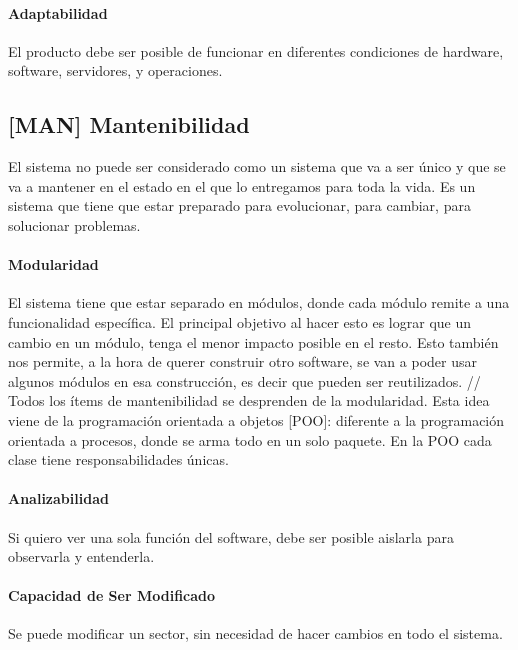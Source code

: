 \hypertarget{adaptabilidad}{%
\paragraph{Adaptabilidad}\label{adaptabilidad}}
El producto debe ser posible de funcionar en
diferentes condiciones de hardware, software, servidores, y operaciones.

\hypertarget{mantenibilidad-man}{%
\subsection{%
{[}MAN{]}
Mantenibilidad
}\label{mantenibilidad-man}}

El sistema no puede ser considerado como un sistema que va a ser único y
que se va a mantener en el estado en el que lo entregamos para toda la
vida. Es un sistema que tiene que estar preparado para evolucionar, para
cambiar, para solucionar problemas.

\hypertarget{modularidad}{%
\paragraph{Modularidad}\label{modularidad}}
El sistema tiene que estar separado en módulos,
  donde cada módulo remite a una funcionalidad específica. El principal
  objetivo al hacer esto es lograr que un cambio en un módulo, tenga el
  menor impacto posible en el resto. Esto también nos permite, a la hora
  de querer construir otro software, se van a poder usar algunos módulos
  en esa construcción, es decir que pueden ser reutilizados. // Todos
  los ítems de mantenibilidad se desprenden de la modularidad. Esta idea
  viene de la programación orientada a objetos {[}POO{]}: diferente a la
  programación orientada a procesos, donde se arma todo en un solo
  paquete. En la POO cada clase tiene responsabilidades únicas.

\hypertarget{analizabilidad}{%
\paragraph{Analizabilidad}\label{analizabilidad}}
Si quiero ver una sola función del software,
  debe ser posible aislarla para observarla y entenderla.

\hypertarget{modificable}{%
\paragraph{Capacidad de Ser Modificado}\label{modificable}}
Se puede modificar un sector,
  sin necesidad de hacer cambios en todo el sistema.


